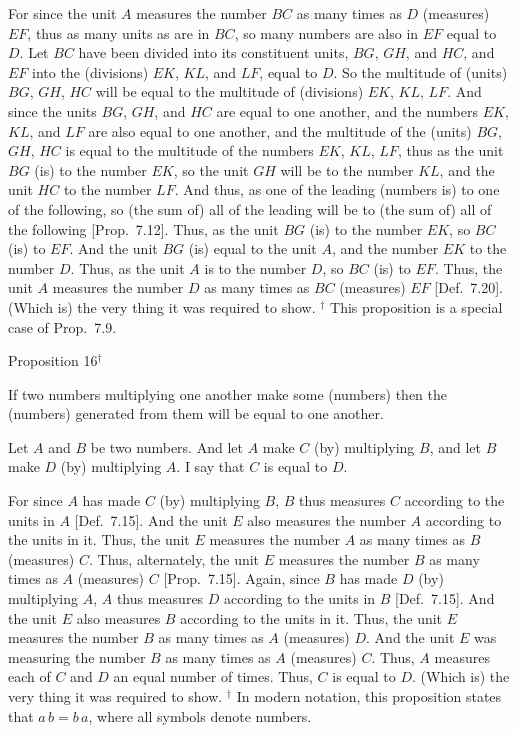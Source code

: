 For since the unit $A$ measures the number $BC$ as many times as 
$D$ (measures) $EF$, thus as many units as are in $BC$, so many 
numbers are also in  $EF$ equal to $D$. Let $BC$ have been divided into its
constituent units, $BG$, $GH$, and $HC$, and $EF$ into the (divisions) $EK$, $KL$, and $LF$, equal
to $D$. So the multitude of (units) $BG$, $GH$, $HC$ will be equal to the multitude
of (divisions) $EK$, $KL$, $LF$. And since the units $BG$, $GH$, and $HC$ are equal to
one another, and the numbers $EK$, $KL$,  and $LF$ are also equal to one another, and the multitude of the (units) $BG$, $GH$, $HC$ is
equal to the multitude of the numbers $EK$, $KL$, $LF$,
thus as the unit $BG$ (is) to the number $EK$, so the unit $GH$ will be to the number $KL$, and
the unit $HC$ to the number $LF$. And thus, as one of the leading (numbers is) to
one of the following, so (the sum of) all of the leading will be to (the sum of) all of the following 
[Prop.~7.12]. Thus, as the unit $BG$ (is) to the number $EK$,
so $BC$ (is) to $EF$. And the unit $BG$ (is) equal to the unit $A$, and the number
$EK$ to the number $D$. Thus, as the unit $A$ is to the number $D$, so $BC$ (is) to
$EF$. Thus, the unit $A$ measures the number $D$ as many times as $BC$ (measures)
$EF$ [Def.~7.20]. (Which is) the very thing it was required to show.
{\footnotesize\noindent$^\dag$ This proposition is a
special case of Prop.~7.9.}~\\


\begin{center}
{\large Proposition 16}$^\dag$
\end{center}

If two numbers multiplying one another make
some (numbers) then the (numbers) generated from them  will be equal
to one another.

\epsfysize=1.6in
\centerline{}

Let $A$ and $B$ be two numbers. And let $A$  make $C$ (by)  multiplying $B$, and let $B$  make $D$ (by) multiplying
$A$. I say that $C$ is equal to $D$.

For since $A$ has made $C$ (by) multiplying $B$, $B$ thus measures $C$ according to the
units in $A$ [Def.~7.15]. And the unit $E$ also measures
the number $A$ according to the units in it. Thus, the unit $E$ measures the
number $A$ as many times as $B$ (measures) $C$. Thus, alternately, the unit
$E$ measures the number $B$ as many times as $A$ (measures) $C$ [Prop.~7.15]. Again, since $B$ has made
$D$ (by) multiplying $A$, $A$ thus measures $D$ according to the units in $B$ [Def.~7.15].  And the unit $E$ also measures $B$ according to
the units in it. Thus, the unit $E$ measures the number $B$ as many times
as $A$ (measures) $D$.  And the unit $E$ was measuring the number $B$ as many times as
$A$ (measures) $C$. Thus, $A$ measures each of $C$ and $D$ an equal number of times. Thus,
$C$ is equal to $D$. (Which is) the very thing it was required to show.
{\footnotesize\noindent$^\dag$ In modern notation, this proposition states that
$a\,b=b\,a$, where all symbols denote numbers.}

